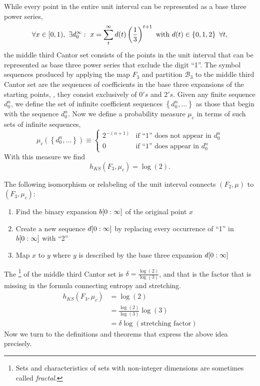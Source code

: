 While every point in the entire unit interval can be represented as a
base three power series, \ie
\begin{equation*}
  \forall x \in [0,1),~ \exists d_0^\infty :~x  = \sum_t^\infty
  {d}{(t)} \left(\frac{1}{3}\right)^{t+1} \text{ with } {d}{(t)} \in
  \left\{ 0,1,2 \right\} ~ \forall t,
\end{equation*}
the middle third Cantor set consists of the points in the unit
interval that can be represented as base three power series that
exclude the digit ``1''.  The symbol sequences produced by applying
the map $F_3$ and partition $\mathcal{B}_3$ to the middle third Cantor
set are the sequences of coefficients in the base three expansions of
the starting points, \ie, they consist exclusively of $0's$ and $2's$.
Given any finite sequence $d_0^n$, we define the set of infinite
coefficient sequences $\left\{d_0^n,\ldots \right\}$ as those that
begin with the sequence $d_0^n$.  Now we define a probability measure
$\mu_c$ in terms of such sets of infinite sequences,
\begin{equation}
  \label{eq:muC}
  \mu_c\left( \left\{ d_0^n,\ldots \right\} \right) \equiv 
  \begin{cases}
    2^{-(n+1)} & \text{if ``1'' does not appear in } d_0^n\\
    0 & \text{if ``1'' does appear in } d_0^n
  \end{cases}
\end{equation}
With this measure we find
\begin{equation*}
  h_{KS}(F_3,\mu_c) = \log(2).
\end{equation*}

The following isomorphism or relabeling of the unit interval connects
$(F_2,\mu)$ to $(F_3,\mu_c)$:
\begin{enumerate}
\item Find the binary expansion $b[0:\infty]$ of the original
  point $x$
\item Create a new sequence $d[0:\infty]$ by replacing every
  occurrence of ``1'' in  $b[0:\infty]$ with ``2''
\item Map $x$ to $y$ where $y$ is described by the base three
  expansion $d[0:\infty]$
\end{enumerate}

The \footnote{Sets and characteristics of
  sets with non-integer dimensions are sometimes called
  \emph{fractal}.} of the middle third Cantor set is
$\delta = \frac{\log(2)}{\log(3)}$, and that is the factor that is
missing in the formula connecting entropy and stretching.
\begin{align}
  h_{KS}(F_3,\mu_c) &= \log(2) \nonumber \\
  &= \frac{\log(2)}{\log(3)} \log(3) \nonumber \\
  \label{eq:CantorCorrect}
  &= \delta \log(\text{stretching factor})
\end{align}
Now we turn to the definitions and theorems that express the above
idea precisely.

